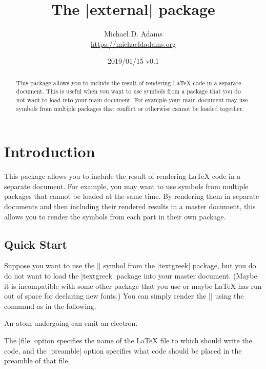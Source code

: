 \documentclass[10pt]{ltxdoc}
\begin{document}
\title{The |external| package}
\author{Michael D. Adams\\\url{https://michaeldadams.org}}
\date{2019/01/15 v0.1}
\maketitle

\begin{abstract}
This package allows you to include the result of rendering LaTeX code
in a separate document.
This is useful when you want to use symbols from a package that you do
not want to load into your main document.
For example your main document may use symbols from multiple packages
that conflict or otherwise cannot be loaded together.
\end{abstract}

\section{Introduction}

This package allows you to include the result of rendering LaTeX code
in a separate document.
For example, you may want to use symbols from multiple packages that
cannot be loaded at the same time.
By rendering them in separate documents and then including their
rendered results in a master document, this allows you to render the
symbols from each part in their own package.

\subsection{Quick Start}

Suppose you want to use the |\textbeta| symbol from the |textgreek|
package, but you do do not want to load the |textgreek| package into
your master document.
(Maybe it is incompatible with some other package that you use or maybe
LaTeX has run out of space for declaring new fonts.)
You can simply render the |\textbeta| using the  command
as in the following.

\begin{tcblisting}{}
An atom undergoing
can emit an electron.
\end{tcblisting}

The |file| option specifies the name of the LaTeX file to which
 should write the code, and the |preamble| option
specifies what code should be placed in the preamble of that file.
\end{document}
